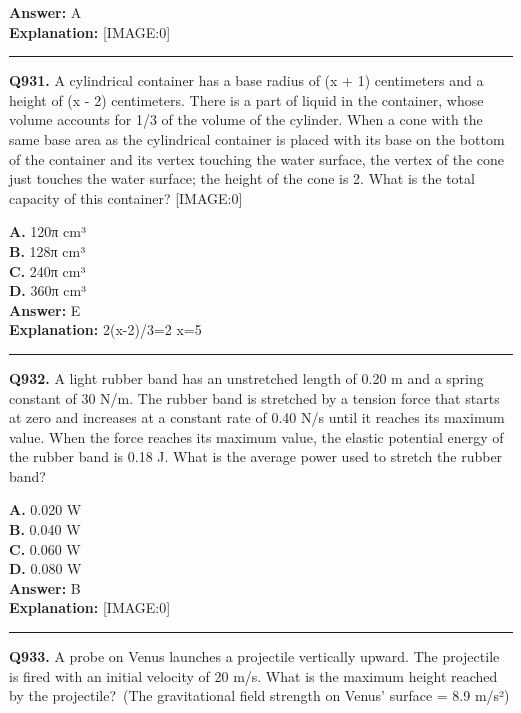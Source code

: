 \documentclass[12pt]{article}
\begin{document}
\textbf{Answer:} A \\
\textbf{Explanation:} [IMAGE:0]

\hrule
\vspace{1em}


\noindent
\textbf{Q931.} A cylindrical container has a base radius of (x + 1) centimeters and a height of (x - 2) centimeters. There is a part of liquid in the container, whose volume accounts for 1/3 of the volume of the cylinder. When a cone with the same base area as the cylindrical container is placed with its base on the bottom of the container and its vertex touching the water surface, the vertex of the cone just touches the water surface; the height of the cone is 2. What is the total capacity of this container?
[IMAGE:0]



\textbf{A.} 120π cm³ \\
\textbf{B.} 128π cm³ \\
\textbf{C.} 240π cm³ \\
\textbf{D.} 360π cm³ \\

\textbf{Answer:} E \\
\textbf{Explanation:} 2(x-2)/3=2 x=5

\hrule
\vspace{1em}


\noindent
\textbf{Q932.} A light rubber band has an unstretched length of 0.20 m and a spring constant of 30 N/m. The rubber band is stretched by a tension force that starts at zero and increases at a constant rate of 0.40 N/s until it reaches its maximum value. When the force reaches its maximum value, the elastic potential energy of the rubber band is 0.18 J. What is the average power used to stretch the rubber band?



\textbf{A.} 0.020 W \\
\textbf{B.} 0.040 W \\
\textbf{C.} 0.060 W \\
\textbf{D.} 0.080 W \\

\textbf{Answer:} B \\
\textbf{Explanation:} [IMAGE:0]

\hrule
\vspace{1em}


\noindent
\textbf{Q933.} A probe on Venus launches a projectile vertically upward. The projectile is fired with an initial velocity of 20 m/s. What is the maximum height reached by the projectile? (The gravitational field strength on Venus' surface = 8.9 m/s²)
\end{document}

